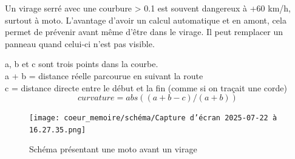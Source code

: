Un virage serré avec une courbure > 0.1 est souvent dangereux à +60 km/h, surtout à moto.
L'avantage d'avoir un calcul automatique et en amont, cela permet de prévenir avant même d'être dans le virage. Il peut remplacer un panneau quand celui-ci n'est pas visible.



\begin{tcolorbox}[title=Calcul de la courbure]
a, b et c sont trois points dans la courbe.\\
a + b = distance réelle parcourue en suivant la route \\
c = distance directe entre le début et la fin (comme si on traçait une corde)
\[
curvature = abs((a + b - c) / (a + b))
\]
\end{tcolorbox}

\begin{figure}[H]
    \centering
    \texttt{[image: coeur\_memoire/schéma/Capture d’écran 2025-07-22 à 16.27.35.png]} 
    \caption{Schéma présentant une moto avant un virage}
\end{figure}







